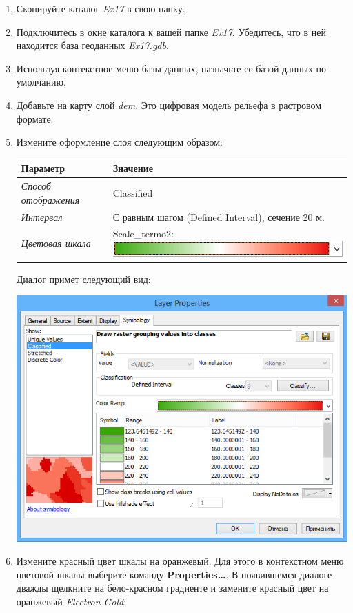 \documentclass[]{book}
\theoremstyle{definition}
\theoremstyle{definition}
\theoremstyle{definition}
\theoremstyle{remark}
\begin{document}
\begin{enumerate}
\def\labelenumi{\arabic{enumi}.}
\item
  Скопируйте каталог \emph{Ex17} в свою папку.
\item
  Подключитесь в окне каталога к вашей папке \emph{Ex17}. Убедитесь, что
  в ней находится база геоданных \emph{Ex17.gdb}.
\item
  Используя контекстное меню базы данных, назначьте ее базой данных по
  умолчанию.
\item
  Добавьте на карту слой \emph{dem}. Это цифровая модель рельефа в
  растровом формате.
\item
  Измените оформление слоя следующим образом:

  \begin{longtable}[]{@{}ll@{}}
  \toprule
  Параметр & Значение\tabularnewline
  \midrule
  \endhead
  \emph{Способ отображения} & Classified\tabularnewline
  \emph{Интервал} & С равным шагом (Defined Interval), сечение 20
  м.\tabularnewline
  \emph{Цветовая шкала} & Scale\_termo2:
  \includegraphics{images/Ex17/image7.png}\tabularnewline
  \bottomrule
  \end{longtable}

  Диалог примет следующий вид:

  \includegraphics{images/Ex17/image8.png}
\item
  Измените красный цвет шкалы на оранжевый. Для этого в контекстном меню
  цветовой шкалы выберите команду \textbf{Properties\ldots{}}. В
  появившемся диалоге дважды щелкните на бело-красном градиенте и
  замените красный цвет на оранжевый \emph{Electron Gold}:


\end{enumerate}
\end{document}
